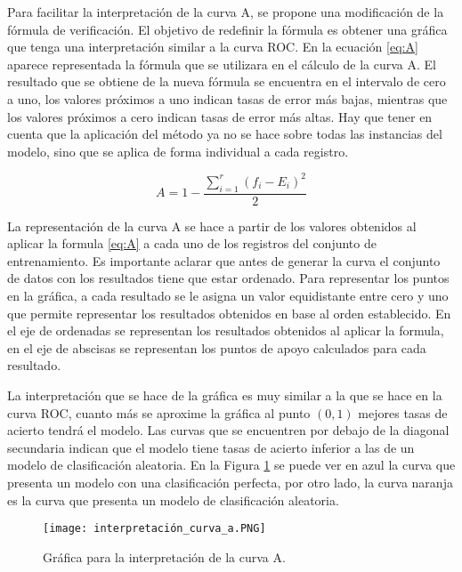 \bigbreak

Para facilitar la interpretación de la curva A, se propone una modificación de la fórmula de verificación. El objetivo de redefinir la fórmula es obtener una gráfica que tenga una interpretación similar a la curva ROC. En la ecuación \ref{eq:A} aparece representada la fórmula que se utilizara en el cálculo de la curva A. El resultado que se obtiene de la nueva fórmula se encuentra en el intervalo de cero a uno, los valores próximos a uno indican tasas de error más bajas, mientras que los valores próximos a cero indican tasas de error más altas. Hay que tener en cuenta que la aplicación del método ya no se hace sobre todas las instancias del modelo, sino que se aplica de forma individual a cada registro.

\bigbreak

\begin{equation}
    A = 1-\frac{\sum_{i=1}^{r}{(f_{i}-E_{i})^{2}}}{2}
    \label{eq:A}
\end{equation}

\bigbreak



La representación de la curva A se hace a partir de los valores obtenidos al aplicar la formula \ref{eq:A} a cada uno de los registros del conjunto de entrenamiento. Es importante aclarar que antes de generar la curva el conjunto de datos con los resultados tiene que estar ordenado. Para representar los puntos en la gráfica, a cada resultado se le asigna un valor equidistante entre cero y uno que permite representar los resultados obtenidos en base al orden establecido. En el eje de ordenadas se representan los resultados obtenidos al aplicar la formula, en el eje de abscisas se representan los puntos de apoyo calculados para cada resultado.

\bigbreak

La interpretación que se hace de la gráfica es muy similar a la que se hace en la curva ROC, cuanto más se aproxime la gráfica al punto $(0, 1)$ mejores tasas de acierto tendrá el modelo. Las curvas que se encuentren por debajo de la diagonal secundaria indican que el modelo tiene tasas de acierto inferior a las de un modelo de clasificación aleatoria. En la Figura \ref{fig:1} se puede ver en azul la curva que presenta un modelo con una clasificación perfecta, por otro lado, la curva naranja es la curva que presenta un modelo de clasificación aleatoria.

\bigbreak

\begin{figure}[htp]
    \centering
    \texttt{[image: interpretación\_curva\_a.PNG]}
    \caption{Gráfica para la interpretación de la curva A.}
    \label{fig:1}
\end{figure}

